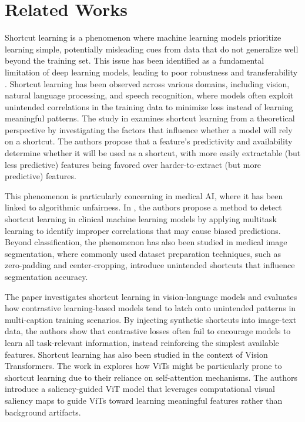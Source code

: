 \section{Related Works}
Shortcut learning is a phenomenon where machine learning models prioritize learning simple, potentially misleading cues from data that do not generalize well beyond the training set. This issue has been identified as a fundamental limitation of deep learning models, leading to poor robustness and transferability \cite{Geirhos_2020}. Shortcut learning has been observed across various domains, including vision, natural language processing, and speech recognition, where models often exploit unintended correlations in the training data to minimize loss instead of learning meaningful patterns. The study in \cite{hermann2024on} examines shortcut learning from a theoretical perspective by investigating the factors that influence whether a model will rely on a shortcut. The authors propose that a feature's predictivity and availability determine whether it will be used as a shortcut, with more easily extractable (but less predictive) features being favored over harder-to-extract (but more predictive) features.

This phenomenon is particularly concerning in medical AI, where it has been linked to algorithmic unfairness. In \cite{Brown_2023}, the authors propose a method to detect shortcut learning in clinical machine learning models by applying multitask learning to identify improper correlations that may cause biased predictions. Beyond classification, the phenomenon has also been studied in medical image segmentation, where commonly used dataset preparation techniques, such as zero-padding and center-cropping, introduce unintended shortcuts that influence segmentation accuracy\cite{10.1007/978-3-031-72111-3_59}. 

The paper \cite{bleeker2024demonstrating} investigates shortcut learning in vision-language models and evaluates how contrastive learning-based models tend to latch onto unintended patterns in multi-caption training scenarios. By injecting synthetic shortcuts into image-text data, the authors show that contrastive losses often fail to encourage models to learn all task-relevant information, instead reinforcing the simplest available features. Shortcut learning has also been studied in the context of Vision Transformers. The work in \cite{10250856} explores how ViTs might be particularly prone to shortcut learning due to their reliance on self-attention mechanisms. The authors introduce a saliency-guided ViT model that leverages computational visual saliency maps to guide ViTs toward learning meaningful features rather than background artifacts.

